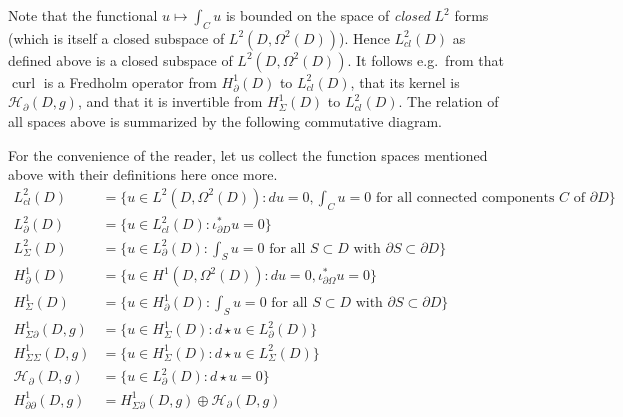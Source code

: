 \documentclass[11pt,reqno]{amsart}
\DeclareMathOperator{\curl}{curl}
\begin{document}
Note that the functional $u\mapsto\int_C u$ is bounded on the space of \emph{closed} $L^2$ forms (which is itself a closed subspace of $L^2(D,\Omega^2(D))$). Hence $L^2_{cl}(D)$ as defined above is a closed subspace of $L^2(D,\Omega^2(D))$. It follows e.g.\ from \cite[Theorem 1.1]{EncisoGarciaPeralta2018} that $\curl$ is a Fredholm operator from $H^1_\partial(D)$ to $L^2_{cl}(D)$, that its kernel is $\mathcal H_\partial(D,g)$, and that it is invertible from $H^1_\Sigma(D)$ to $L^2_{cl}(D)$. The relation of all spaces above is summarized by the following commutative diagram.

\begin{center}
\end{center}

For the convenience of the reader, let us collect the function spaces mentioned above with their definitions here once more.
\allowdisplaybreaks
\begin{align*}
     L^2_{cl}(D) &= \{u \in L^2(D,\Omega^2(D)): du = 0, \textstyle \int_{C} u = 0 \text{ for all connected components $C$ of $\partial D$}\} \\
     L^2_{\partial}(D) &= \{u \in L^2_{cl}(D):\iota_{\partial D}^\ast u = 0\} \\
     L^2_{\Sigma}(D) &= \{u \in L^2_{\partial}(D): \textstyle\int_S u = 0 \text{ for all $S \subset D$ with $\partial S \subset \partial D$}\} \\
     H^1_\partial(D) &= \{u \in H^1(D,\Omega^2(D)): du = 0, \iota_{\partial \Omega}^\ast u = 0 \} \\
     H^1_\Sigma(D) &= \{u \in H^1_\partial(D): \textstyle\int_S u = 0 \text{ for all $S \subset D$ with $\partial S \subset \partial D$}\} \\
     H^1_{\Sigma\partial}(D,g) &= \{u \in H^1_\Sigma(D): d\!\star\! u \in L^2_{\partial}(D)\} \\
     H^1_{\Sigma\Sigma}(D,g) &= \{u \in H^1_\Sigma(D): d\!\star\! u \in L^2_{\Sigma}(D)\} \\
     \mathcal H_\partial(D,g) &= \{u \in L^2_\partial(D): d\!\star\! u = 0\} \\
     H^1_{\partial\partial}(D,g) &= H^1_{\Sigma\partial}(D,g) \oplus \mathcal H_\partial(D,g)
\end{align*}
\end{document}
